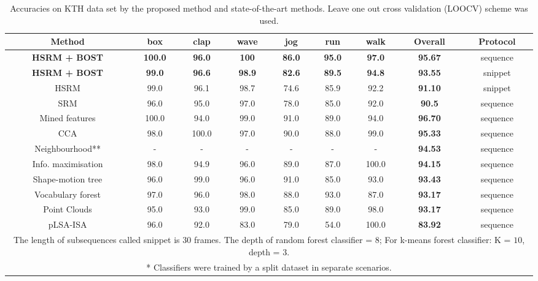 \begin{sidewaystable}
\centering
\begin{tabular}{|c|c|c|c|c|c|c|c|c|}
\hline
\textbf{Method} & \textbf{box} & \textbf{clap} & \textbf{wave} & \textbf{jog} & \textbf{run} & \textbf{walk} & \textbf{Overall} & \textbf{Protocol} \\
\hline
\textbf{ \color{blue} HSRM + BOST} & \textbf{ \color{blue} 100.0} & \textbf{ \color{blue}96.0} & \textbf{ \color{blue}100} & \textbf{ \color{blue}86.0} & \textbf{ \color{blue}95.0} & \textbf{ \color{blue}97.0} & \textbf{ \color{blue}95.67} & sequence\\
\textbf{ \color{blue} HSRM + BOST} & \textbf{ \color{blue} 99.0} & \textbf{ \color{blue} 96.6} & \textbf{ \color{blue}98.9} & \textbf{ \color{blue}82.6} & \textbf{ \color{blue}89.5} & \textbf{ \color{blue}94.8} & \textbf{ \color{blue} 93.55} & snippet\\
HSRM & 99.0 & 96.1 & 98.7 & 74.6 & 85.9 & 92.2 & \textbf{ 91.10} & snippet\\
SRM\cite{Ryoo2009} & 96.0 & 95.0 & 97.0 & 78.0 & 85.0 & 92.0 & \textbf{ 90.5} & sequence\\
\hline
Mined features \cite{Gilbert2009} & 100.0 & 94.0 & 99.0 & 91.0 & 89.0 & 94.0 & \textbf{ 96.70} & sequence\\
CCA \cite{Kim2007} & 98.0 & 100.0 & 97.0 & 90.0 & 88.0 & 99.0 & \textbf{ 95.33} & sequence\\
Neighbourhood** \cite{Kovashka2010} & - & - & - & - & - & - & \textbf{ 94.53} & sequence\\
Info. maximisation \cite{Liu2008} & 98.0 & 94.9 & 96.0 & 89.0 & 87.0 & 100.0 & \textbf{ 94.15} & sequence\\
Shape-motion tree \cite{Lin2009} & 96.0 & 99.0 & 96.0 & 91.0 & 85.0 & 93.0 & \textbf{ 93.43} & sequence\\
Vocabulary forest \cite{Mikolajczyk2008} & 97.0 & 96.0 & 98.0 & 88.0 & 93.0 & 87.0 & \textbf{ 93.17} & sequence\\
Point Clouds \cite{Bregonzio2009} & 95.0 & 93.0 & 99.0 & 85.0 & 89.0 & 98.0 & \textbf{ 93.17} & sequence\\
pLSA-ISA \cite{Wong2007} & 96.0 & 92.0 & 83.0 & 79.0 & 54.0 & 100.0 & \textbf{ 83.92} & sequence\\
\hline
\multicolumn{9}{p{0.9\linewidth}}{
\scriptsize * The length of subsequences called snippet is 30 frames. The depth of random forest classifier = $8$; For k-means forest classifier: K = $10$, depth = $3$. 
}\\
\multicolumn{9}{p{0.9\linewidth}}{
\scriptsize ** Classifiers were trained by a split dataset in separate scenarios. 
}\\
\end{tabular}
\caption{Accuracies on KTH data set by the proposed method and state-of-the-art methods. Leave one out cross validation (LOOCV) scheme was used.}
\label{tab/act/compare}
\end{sidewaystable}
